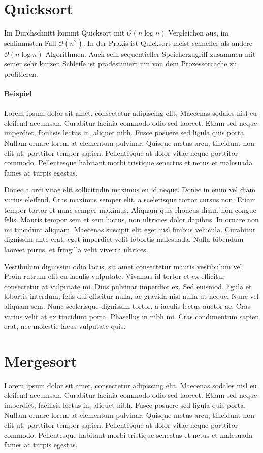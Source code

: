 \documentclass[12pt, a4paper, titlepage, hidelinks]{scrreprt}
\begin{document}
\section{Quicksort}

Im Durchschnitt kommt Quicksort mit $\mathcal{O}(n\log{}n)$ Vergleichen aus, im schlimmsten Fall $\mathcal{O}(n^2)$. In der Praxis ist Quicksort meist schneller als andere $\mathcal{O}(n\log{}n)$ Algorithmen. Auch sein sequentieller Speicherzugriff zusammen mit seiner sehr kurzen Schleife ist prädestiniert um von dem Prozessorcache zu profitieren.

\paragraph{Beispiel}
Lorem ipsum dolor sit amet, consectetur adipiscing elit. Maecenas sodales nisl eu eleifend accumsan. Curabitur lacinia commodo odio sed laoreet. Etiam sed neque imperdiet, facilisis lectus in, aliquet nibh. Fusce posuere sed ligula quis porta. Nullam ornare lorem at elementum pulvinar. Quisque metus arcu, tincidunt non elit ut, porttitor tempor sapien. Pellentesque at dolor vitae neque porttitor commodo. Pellentesque habitant morbi tristique senectus et netus et malesuada fames ac turpis egestas.

Donec a orci vitae elit sollicitudin maximus eu id neque. Donec in enim vel diam varius eleifend. Cras maximus semper elit, a scelerisque tortor cursus non. Etiam tempor tortor et nunc semper maximus. Aliquam quis rhoncus diam, non congue felis. Mauris tempor sem et sem luctus, non ultricies dolor dapibus. In ornare non mi tincidunt aliquam. Maecenas suscipit elit eget nisl finibus vehicula. Curabitur dignissim ante erat, eget imperdiet velit lobortis malesuada. Nulla bibendum laoreet purus, et fringilla velit viverra ultrices.

Vestibulum dignissim odio lacus, sit amet consectetur mauris vestibulum vel. Proin rutrum elit eu iaculis vulputate. Vivamus id tortor et ex efficitur consectetur at vulputate mi. Duis pulvinar imperdiet ex. Sed euismod, ligula et lobortis interdum, felis dui efficitur nulla, ac gravida nisl nulla ut neque. Nunc vel aliquam sem. Nunc scelerisque dignissim tortor, a iaculis lectus auctor ac. Cras varius velit at ex tincidunt porta. Phasellus in nibh mi. Cras condimentum sapien erat, nec molestie lacus vulputate quis. 

\section{Mergesort}
Lorem ipsum dolor sit amet, consectetur adipiscing elit. Maecenas sodales nisl eu eleifend accumsan. Curabitur lacinia commodo odio sed laoreet. Etiam sed neque imperdiet, facilisis lectus in, aliquet nibh. Fusce posuere sed ligula quis porta. Nullam ornare lorem at elementum pulvinar. Quisque metus arcu, tincidunt non elit ut, porttitor tempor sapien. Pellentesque at dolor vitae neque porttitor commodo. Pellentesque habitant morbi tristique senectus et netus et malesuada fames ac turpis egestas.
\end{document}
